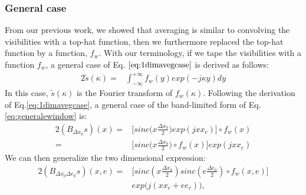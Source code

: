 \subsubsection{General case}
From our previous work, we showed that averaging is similar to convolving the visibilities with a top-hat function, then we 
furthermore replaced the top-hat function by a function, $f_w$. With our terminology, if we tape the visibilities with a function $f_w$, a 
general case of  Eq. $\ref{eq:1dimavegcase}$ is derived as follows:
\begin{alignat}{2}
\tilde{s}(\kappa) =& \int_{-\infty}^{+\infty}f_{w}(y)exp(-j\kappa y)dy \label{eq:generalewindow} 
\end{alignat}
In this case, $\tilde{s}(\kappa)$ is the Fourier transform of $f_w(\kappa)$. Following the derivation of Eq.\ref{eq:1dimavegcase}, a 
general case of the band-limited form of Eq.\ref{eq:generalewindow} is:
\begin{alignat*}{2}
(B_{\Delta x_0}s)(x) = & \bigg[sinc \big(x\frac{\Delta x_0}{2}\big) exp(jxx_c)\bigg]\circ f_w(x)\\
		     = & \bigg[sinc \big(x\frac{\Delta x_0}{2} \big)\circ f_w(x)\bigg]exp(jxx_c)
\end{alignat*}
We can then generalize the  two dimensional expression:
\begin{alignat*}{2}
(B_{\Delta x_0 \Delta e_0}s)(x,e)=&\bigg[sinc (x\frac{\Delta x_0}{2})sinc(e\frac{\Delta e_0}{2})\circ f_{w}(x,e)\bigg]\\
				  &exp\big(j (xx_c+ee_c)\big),
\end{alignat*}
